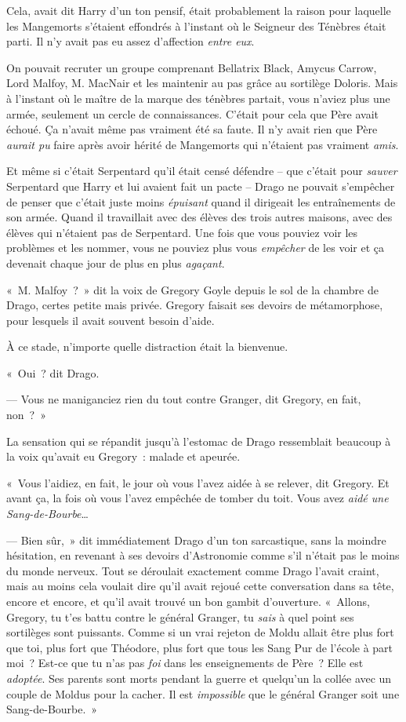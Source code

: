 Cela, avait dit Harry d'un ton pensif, était probablement la raison pour laquelle les Mangemorts s'étaient effondrés à l'instant où le Seigneur des Ténèbres était parti.
Il n'y avait pas eu assez d'affection \emph{entre eux}.

On pouvait recruter un groupe comprenant Bellatrix Black, Amycus Carrow, Lord Malfoy, M. MacNair et les maintenir au pas grâce au sortilège Doloris.
Mais à l'instant où le maître de la marque des ténèbres partait, vous n'aviez plus une armée, seulement un cercle de connaissances.
C'était pour cela que Père avait échoué.
Ça n'avait même pas vraiment été sa faute.
Il n'y avait rien que Père \emph{aurait pu} faire après avoir hérité de Mangemorts qui n'étaient pas vraiment \emph{amis}.

Et même si c'était Serpentard qu'il était censé défendre -- que c'était pour \emph{sauver} Serpentard que Harry et lui avaient fait un pacte -- Drago ne pouvait s'empêcher de penser que c'était juste moins \emph{épuisant} quand il dirigeait les entraînements de son armée.
Quand il travaillait avec des élèves des trois autres maisons, avec des élèves qui n'étaient pas de Serpentard.
Une fois que vous pouviez voir les problèmes et les nommer, vous ne pouviez plus vous \emph{empêcher} de les voir et ça devenait chaque jour de plus en plus \emph{agaçant}.

«~M. Malfoy~?~»
dit la voix de Gregory Goyle depuis le sol de la chambre de Drago, certes petite mais privée.
Gregory faisait ses devoirs de métamorphose, pour lesquels il avait souvent besoin d'aide.

À ce stade, n'importe quelle distraction était la bienvenue.

«~Oui~? dit Drago.

--- Vous ne maniganciez rien du tout contre Granger, dit Gregory, en fait, non~?~»

La sensation qui se répandit jusqu'à l'estomac de Drago ressemblait beaucoup à la voix qu'avait eu Gregory~: malade et apeurée.

«~Vous l'aidiez, en fait, le jour où vous l'avez aidée à se relever, dit Gregory.
Et avant ça, la fois où vous l'avez empêchée de tomber du toit.
Vous avez \emph{aidé une Sang-de-Bourbe}…

--- Bien sûr,~» dit immédiatement Drago d'un ton sarcastique, sans la moindre hésitation, en revenant à ses devoirs d'Astronomie comme s'il n'était pas le moins du monde nerveux.
Tout se déroulait exactement comme Drago l'avait craint, mais au moins cela voulait dire qu'il avait rejoué cette conversation dans sa tête, encore et encore, et qu'il avait trouvé un bon gambit d'ouverture.
«~Allons, Gregory, tu t'es battu contre le général Granger, tu \emph{sais} à quel point ses sortilèges sont puissants.
Comme si un vrai rejeton de Moldu allait être plus fort que toi, plus fort que Théodore, plus fort que tous les Sang Pur de l'école à part moi~?
Est-ce que tu n'as pas \emph{foi} dans les enseignements de Père~?
Elle est \emph{adoptée}.
Ses parents sont morts pendant la guerre et quelqu'un la collée avec un couple de Moldus pour la cacher.
Il est \emph{impossible} que le général Granger soit une Sang-de-Bourbe.~»

